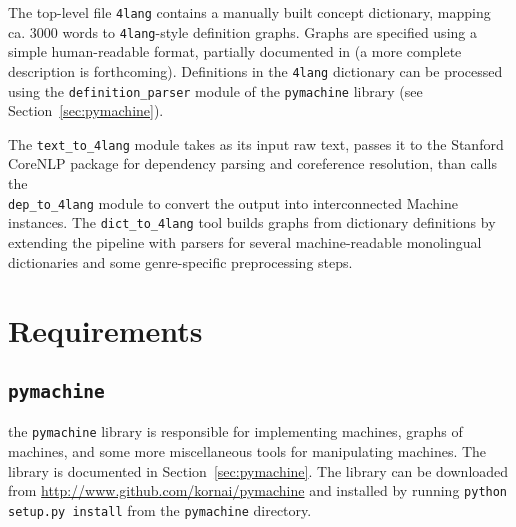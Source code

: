 \documentclass{article}
\newcommand{\defl}{\texttt{dep\_to\_4lang}\xspace}
\newcommand{\difl}{\texttt{dict\_to\_4lang}\xspace}
\newcommand{\fl}{\texttt{4lang}\xspace}
\begin{document}
The top-level file \fl contains a manually built concept dictionary, mapping
ca. 3000 words to \fl-style definition graphs. Graphs are specified using a
simple human-readable format, partially documented in \cite{Kornai:2015a} (a
more complete description is forthcoming). Definitions in the \fl dictionary
can be processed using the \texttt{definition\_parser} module of the
\texttt{pymachine} library (see Section~\ref{sec:pymachine}).

The \texttt{text\_to\_4lang}
module takes as its input raw text, passes it to the Stanford CoreNLP package
for dependency parsing and coreference resolution, than calls the \\
\defl module to convert the output into interconnected Machine
instances. The \difl tool builds graphs from
dictionary definitions by extending the pipeline with parsers
for several machine-readable monolingual dictionaries and some genre-specific
preprocessing steps.

\section{Requirements}
\label{sec:requirements}

\subsection{\texttt{pymachine}}
the \texttt{pymachine} library is responsible for implementing machines, graphs
of machines, and some more miscellaneous tools for manipulating machines. The
library is documented in Section~\ref{sec:pymachine}. The library can be
downloaded from \url{http://www.github.com/kornai/pymachine} and installed by
running \texttt{python setup.py install} from the \texttt{pymachine} directory.
\end{document}
